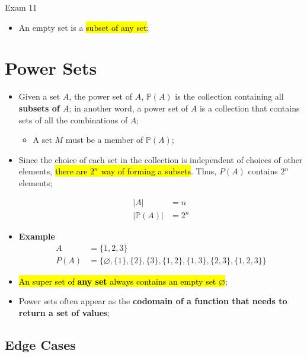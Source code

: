 \documentclass{note}
\begin{document}
\begin{note}{Exam 11}
\begin{itemize}
        \item An empty set is a \hl{subset of any set};

    \end{itemize}

\section{Power Sets}

\begin{itemize}
    \item Given a set $ A $, the power set of $ A $, $ \mathbb{P}(A) $ is the collection containing all \textbf{subsets of $ A $}; in another word,
    a power set of $ A $ is a collection that contains sets of all the combinations of $ A $;
    \begin{itemize}
        \item A set $ M $ must be a member of $ \mathbb{P}(A) $;
    \end{itemize}

    \item Since the choice of each set in the collection is independent of choices of other elements, \hl{there are $ 2^{n} $ way 
    of forming a subsets}. Thus, $ P (A) $ contains $ 2^{n} $ elements;
    
    \begin{align*}
        \left| A \right| &= n \\
        \left| \mathbb{P} (A)  \right| &= 2^{n}
    \end{align*}

    \item \textbf{Example}
    \begin{align*}
        A &= \{ 1, 2, 3\} \\
        P (A) &= \{ \varnothing, \{ 1 \}, \{ 2 \}, \{ 3 \}, \{ 1, 2 \}, \{ 1, 3 \}, \{ 2, 3 \}, \{ 1, 2, 3 \} \}
    \end{align*}

    \item \hl{An super set of \textbf{any set} always contains an empty set $ \varnothing $};
    \item Power sets often appear as the \textbf{codomain of a function that needs to return a set of values};
\end{itemize}

    \subsection{Edge Cases}


\end{note}
\end{document}
